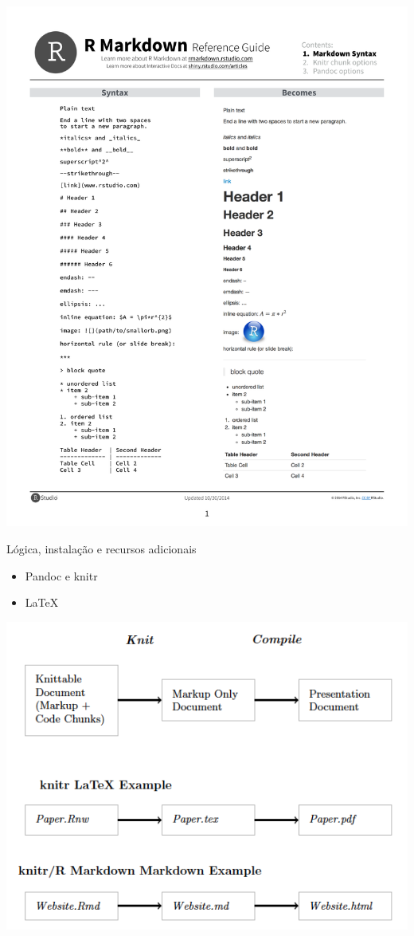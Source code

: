 \documentclass[
  9pt,
  ignorenonframetext,
]{beamer}
\begin{document}
\begin{frame}{}
\protect\hypertarget{section-2}{}
\includegraphics{imgs/rmarkdown-reference.pdf}
\end{frame}

\begin{frame}{Lógica, instalação e recursos adicionais}
\protect\hypertarget{luxf3gica-instalauxe7uxe3o-e-recursos-adicionais}{}
\begin{itemize}
\item
  Pandoc e knitr
\item
  LaTeX
\end{itemize}

\includegraphics{imgs/sistema.png}
\end{frame}
\end{document}
